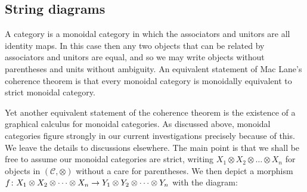 \subsection{String diagrams}
A  category is a monoidal category in which the
associators and unitors are all identity maps. In this case then any two objects
that can be related by associators and unitors are equal, and so we may write
objects without parentheses and units without ambiguity. An equivalent statement
of Mac Lane's coherence theorem is that every monoidal category is monoidally
equivalent to strict monoidal category. 

Yet another equivalent statement of the coherence theorem is the existence of a
graphical calculus for monoidal categories. As discussed above, monoidal
categories figure strongly in our current investigations precisely because of
this. We leave the details to discussions elsewhere. The main point is that we
shall be free to assume our monoidal categories are strict, writing $X_1 \otimes
X_2 \otimes \dots \otimes X_n$ for objects in $(\mathcal C,\otimes)$ without a
care for parentheses. We then depict a morphism $f{\colon} X_1 \otimes X_2 \otimes
\dots \otimes X_n \to Y_1 \otimes Y_2 \otimes \dots \otimes Y_n$ with the
diagram:
